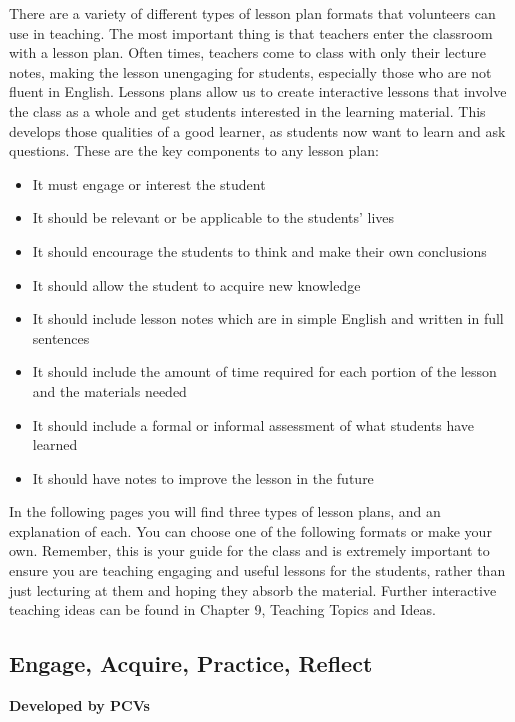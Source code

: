 There are a variety of different types of lesson plan formats that volunteers can use in teaching. The most important thing is that teachers enter the classroom with a lesson plan. Often times, teachers come to class with only their lecture notes, making the lesson unengaging for students, especially those who are not fluent in English. Lessons plans allow us to create interactive lessons that involve the class as a whole and get students interested in the learning material. This develops those qualities of a good learner, as students now want to learn and ask questions. These are the key components to any lesson plan:

\begin{itemize}
\item It must engage or interest the student
\item It should be relevant or be applicable to the students' lives
\item It should encourage the students to think and make their own conclusions
\item It should allow the student to acquire new knowledge
\item It should include lesson notes which are in simple English and written in full sentences
\item It should include the amount of time required for each portion of the lesson and the materials needed
\item It should include a formal or informal assessment of what students have learned
\item It should have notes to improve the lesson in the future
\end{itemize}

\begin{figure}[h!]
\centering
\setlength\fboxsep{0pt}
\setlength\fboxrule{2pt}
\end{figure}

In the following pages you will find three types of lesson plans, and an explanation of each.  You can choose one of the following formats or make your own.  Remember, this is your guide for the class and is extremely important to ensure you are teaching engaging and useful lessons for the students, rather than just lecturing at them and hoping they absorb the material.  Further interactive teaching ideas can be found in Chapter 9, Teaching Topics and Ideas.


\newpage

\begin{center}
\section{Engage, Acquire, Practice, Reflect}
\textbf{Developed by PCVs} \\
\end{center}

